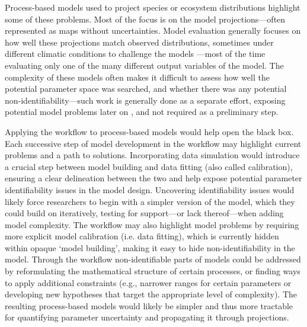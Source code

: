 \documentclass[11pt]{article}
\begin{document}
Process-based models used to project species or ecosystem distributions highlight some of these problems. Most of the focus is on the model projections---often represented as maps without uncertainties. Model evaluation generally focuses on how well these projections match observed distributions, sometimes under different climatic conditions to challenge the models \citep{VanderMeersch2025a}---most of the time evaluating only one of the many different output variables of the model. %
The complexity of these models often makes it difficult to assess how well the potential parameter space was searched, and whether there was any potential non-identifiability---such work is generally done as a separate effort, exposing potential model problems later on \citep{VanderMeersch2025b}, and not required as a preliminary step.  

Applying the workflow to process-based models would help open the black box.
Each successive step of model development in the workflow may highlight current problems and a path to solutions. Incorporating data simulation would introduce a crucial step between model building and data fitting (also called calibration), ensuring a clear delineation between the two and help expose potential parameter identifiability issues in the model design. %
Uncovering identifiability issues would likely force researchers to begin with a simpler version of the model, which they could build on iteratively, testing for support---or lack thereof---when adding model complexity. The workflow may also highlight model problems by requiring more explicit model calibration (i.e. data fitting), %
which is currently hidden within opaque `model building', making it easy to hide non-identifiability in the model. Through the workflow non-identifiable parts of models could be addressed by reformulating the mathematical structure of certain processes, or finding ways to apply additional constraints (e.g., narrower ranges for certain parameters or developing new hypotheses that target the appropriate level of complexity). The resulting process-based models would likely be simpler and thus more tractable for quantifying parameter uncertainty and propagating it through projections. 
\end{document}
